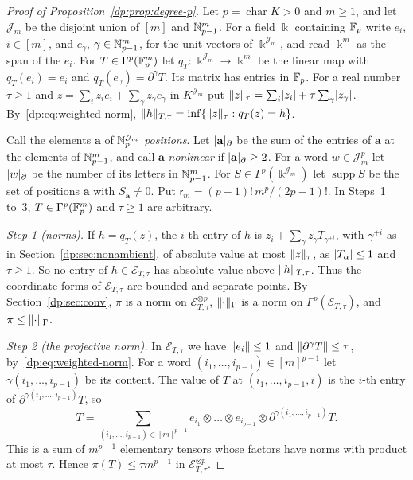 \begin{proof}[Proof of Proposition~\ref{dp:prop:degree-p}]
Let $p=\operatorname{char}K>0$ and $m\ge1$, and let $\mathcal J_m$ be the disjoint union of $[m]$ and $\mathbb N^m_{p-1}$. For a field $\Bbbk$ containing $\mathbb F_p$ write $e_i$, $i\in[m]$, and $e_\gamma$, $\gamma\in\mathbb N^m_{p-1}$, for the unit vectors of $\Bbbk^{\mathcal J_m}$, and read $\Bbbk^m$ as the span of the $e_i$. For $T\in\Gamma^p(\mathbb F_p^m)$ let $q_T\colon\Bbbk^{\mathcal J_m}\to\Bbbk^m$ be the linear map with $q_T(e_i)=e_i$ and $q_T(e_\gamma)=\partial^\gamma T$. Its matrix has entries in $\mathbb F_p$. For a real number $\tau\ge1$ and $z=\sum_iz_ie_i+\sum_\gamma z_\gamma e_\gamma$ in $K^{\mathcal J_m}$ put $\lVert z\rVert_\tau=\sum_i\lvert z_i\rvert+\tau\sum_\gamma\lvert z_\gamma\rvert$. By~\eqref{dp:eq:weighted-norm}, $\lVert h\rVert_{T,\tau}=\inf\{\lVert z\rVert_\tau:q_T(z)=h\}$.

Call the elements $\mathbf a$ of $\mathbb N^{\mathcal J_m}_p$ \emph{positions}. Let $\lvert \mathbf a\rvert_\partial$ be the sum of the entries of $\mathbf a$ at the elements of $\mathbb N^m_{p-1}$, and call $\mathbf a$ \emph{nonlinear} if $\lvert \mathbf a\rvert_\partial\ge2$. For a word $w\in\mathcal J_m^p$ let $\lvert w\rvert_\partial$ be the number of its letters in $\mathbb N^m_{p-1}$. For $S\in\Gamma^p(\Bbbk^{\mathcal J_m})$ let $\operatorname{supp}S$ be the set of positions $\mathbf a$ with $S_{\mathbf a}\ne0$. Put $\mathsf r_m=(p-1)!\,m^p/(2p-1)!$. In Steps~1 to~3, $T\in\Gamma^p(\mathbb F_p^m)$ and $\tau\ge1$ are arbitrary.

\emph{Step 1 (norms).} If $h=q_T(z)$, the $i$-th entry of $h$ is $z_i+\sum_\gamma z_\gamma T_{\gamma^{+i}}$, with $\gamma^{+i}$ as in Section~\ref{dp:sec:nonambient}, of absolute value at most $\lVert z\rVert_\tau$, as $\lvert T_\alpha\rvert\le1$ and $\tau\ge1$. So no entry of $h\in\mathcal E_{T,\tau}$ has absolute value above $\lVert h\rVert_{T,\tau}$. Thus the coordinate forms of $\mathcal E_{T,\tau}$ are bounded and separate points. By Section~\ref{dp:sec:conv}, $\pi$ is a norm on $\mathcal E_{T,\tau}^{\otimes p}$, $\lVert \cdot\rVert_\Gamma$ is a norm on $\Gamma^p(\mathcal E_{T,\tau})$, and $\pi\le\lVert \cdot\rVert_\Gamma$.

\emph{Step 2 (the projective norm).} In $\mathcal E_{T,\tau}$ we have $\lVert e_i\rVert\le1$ and $\lVert \partial^\gamma T\rVert\le\tau$, by~\eqref{dp:eq:weighted-norm}. For a word $(i_1,\dots,i_{p-1})\in[m]^{p-1}$ let $\gamma(i_1,\dots,i_{p-1})$ be its content. The value of $T$ at $(i_1,\dots,i_{p-1},i)$ is the $i$-th entry of $\partial^{\gamma(i_1,\dots,i_{p-1})}T$, so
\[
 T=\sum_{(i_1,\dots,i_{p-1})\in[m]^{p-1}}e_{i_1}\otimes\dots\otimes e_{i_{p-1}}\otimes\partial^{\gamma(i_1,\dots,i_{p-1})}T.
\]
This is a sum of $m^{p-1}$ elementary tensors whose factors have norms with product at most $\tau$. Hence $\pi(T)\le\tau m^{p-1}$ in $\mathcal E_{T,\tau}^{\otimes p}$.


\end{proof}
